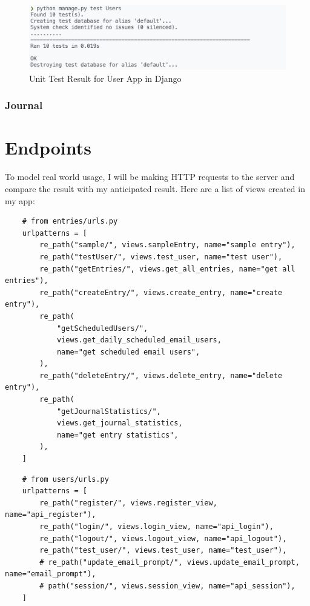 \begin{figure}[H]
    \centering
    \includegraphics[width=\textwidth]{Assets/users_test_result.png}
    \caption{Unit Test Result for User App in Django}
    \label{fig:unit_test_user}
\end{figure}

\subsubsection{Journal}



\section{Endpoints}
To model real world usage, I will be making HTTP requests to the server and compare the result with my anticipated result. Here are a list of views created in my app:

\begin{verbatim}
    # from entries/urls.py
    urlpatterns = [
        re_path("sample/", views.sampleEntry, name="sample entry"),
        re_path("testUser/", views.test_user, name="test user"),
        re_path("getEntries/", views.get_all_entries, name="get all entries"),
        re_path("createEntry/", views.create_entry, name="create entry"),
        re_path(
            "getScheduledUsers/",
            views.get_daily_scheduled_email_users,
            name="get scheduled email users",
        ),
        re_path("deleteEntry/", views.delete_entry, name="delete entry"),
        re_path(
            "getJournalStatistics/",
            views.get_journal_statistics,
            name="get entry statistics",
        ),
    ]
\end{verbatim}


\begin{verbatim}
    # from users/urls.py
    urlpatterns = [
        re_path("register/", views.register_view, name="api_register"),
        re_path("login/", views.login_view, name="api_login"),
        re_path("logout/", views.logout_view, name="api_logout"),
        re_path("test_user/", views.test_user, name="test_user"),
        # re_path("update_email_prompt/", views.update_email_prompt, name="email_prompt"),
        # path("session/", views.session_view, name="api_session"),
    ]
\end{verbatim}

